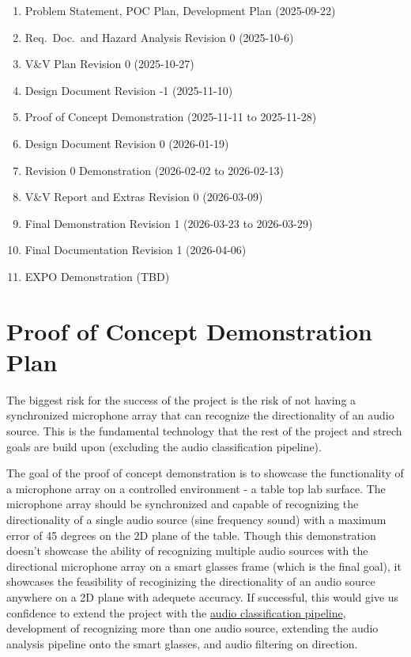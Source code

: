 \documentclass{article}
\begin{document}
\begin{enumerate}
  \item Problem Statement, POC Plan, Development Plan (2025-09-22)
  \item Req.\ Doc.\ and Hazard Analysis Revision 0 (2025-10-6)
  \item V\&V Plan Revision 0 (2025-10-27)
  \item Design Document Revision -1 (2025-11-10)
  \item Proof of Concept Demonstration (2025-11-11 to 2025-11-28)
  \item Design Document Revision 0 (2026-01-19)
  \item Revision 0 Demonstration (2026-02-02 to 2026-02-13)
  \item V\&V Report and Extras Revision 0 (2026-03-09)
  \item Final Demonstration Revision 1 (2026-03-23 to 2026-03-29)
  \item Final Documentation Revision 1 (2026-04-06)
  \item EXPO Demonstration (TBD)
\end{enumerate}

\section{Proof of Concept Demonstration Plan}


\hspace{1cm}

The biggest risk for the success of the project is the risk of not having a synchronized microphone array that can recognize the directionality of an audio source.
This is the fundamental technology that the rest of the project and strech goals are build upon (excluding the audio classification pipeline).

The goal of the proof of concept demonstration is to showcase the functionality of a microphone array on a controlled environment - a table top lab surface.
The microphone array should be synchronized and capable of recognizing the directionality of a single audio source (sine frequency sound) with a maximum error of 45 degrees on the 2D plane of the table.
Though this demonstration doesn't showcase the ability of recognizing multiple audio sources with the directional microphone array on a smart glasses frame (which is the final goal), it showcases the feasibility of recoginizing the directionality of an audio source anywhere on a 2D plane with adequete accuracy.
If successful, this would give us confidence to extend the project with the \hyperlink{audio_classification_pipeline}{audio classification pipeline}, development of recognizing more than one audio source, extending the audio analysis pipeline onto the smart glasses, and audio filtering on direction. 
\end{document}

